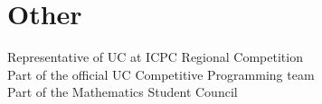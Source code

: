 \documentclass[11pt]{article} %
\begin{document}
\section*{Other}
Representative of UC at ICPC Regional Competition\\
Part of the official UC Competitive Programming team\\
Part of the Mathematics Student Council





\end{document}
